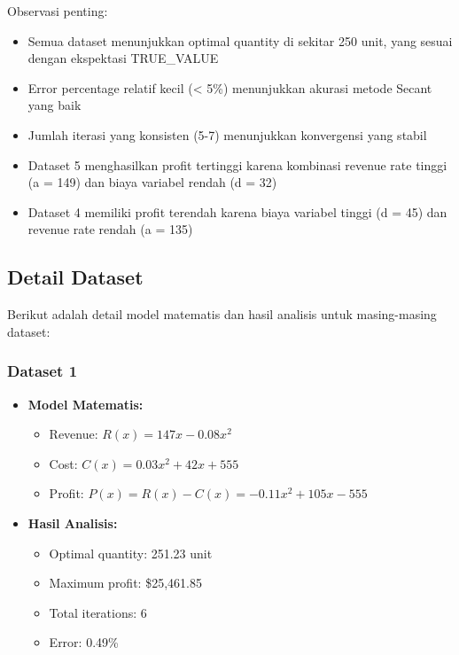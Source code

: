 \documentclass[conference]{IEEEtran}
\begin{document}
Observasi penting:
\begin{itemize}
\item Semua dataset menunjukkan optimal quantity di sekitar 250 unit, yang sesuai dengan ekspektasi TRUE\_VALUE
\item Error percentage relatif kecil (< 5\%) menunjukkan akurasi metode Secant yang baik
\item Jumlah iterasi yang konsisten (5-7) menunjukkan konvergensi yang stabil
\item Dataset 5 menghasilkan profit tertinggi karena kombinasi revenue rate tinggi (a = 149) dan biaya variabel rendah (d = 32)
\item Dataset 4 memiliki profit terendah karena biaya variabel tinggi (d = 45) dan revenue rate rendah (a = 135)
\end{itemize}

\subsection{Detail Dataset}
Berikut adalah detail model matematis dan hasil analisis untuk masing-masing dataset:

\subsubsection{Dataset 1}
\begin{itemize}
\item \textbf{Model Matematis:}
\begin{itemize}
\item Revenue: $R(x) = 147x - 0.08x^2$
\item Cost: $C(x) = 0.03x^2 + 42x + 555$
\item Profit: $P(x) = R(x) - C(x) = -0.11x^2 + 105x - 555$
\end{itemize}
\item \textbf{Hasil Analisis:}
\begin{itemize}
\item Optimal quantity: 251.23 unit
\item Maximum profit: \$25,461.85
\item Total iterations: 6
\item Error: 0.49\%
\end{itemize}
\end{itemize}
\end{document}

